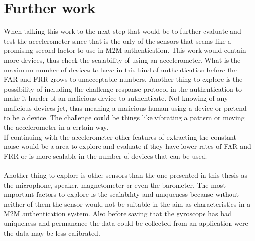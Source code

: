 \section{Further work}
When talking this work to the next step that would be to further evaluate and test the accelerometer since that is the only of the sensors that seems like a promising second factor to use in M2M authentication. This work would contain more devices, thus check the scalability of using an accelerometer. What is the maximum number of devices to have in this kind of authentication before the FAR and FRR grows to unacceptable numbers. Another thing to explore is  the possibility of including the challenge-response protocol in the authentication to make it harder of an malicious device to authenticate. Not knowing of any malicious devices jet, thus meaning a malicious human using a device or pretend to be a device. The challenge could be things like vibrating a pattern or moving the accelerometer in a certain way.\\
If continuing with the accelerometer other features of extracting the constant noise would be a area to explore and evaluate if they have lower rates of FAR and FRR or is more scalable in the number of devices that can be used. \\
\\
Another thing to explore is other sensors than the one presented in this thesis as the microphone, speaker, magnetometer or even the barometer. The most important factors to explore is the scalability and uniqueness because without neither of them the sensor would not be suitable in the aim as characteristics in a M2M authentication system. Also before saying that the gyroscope has bad uniqueness and permanence the data could be collected from an application were the data may be less calibrated.
